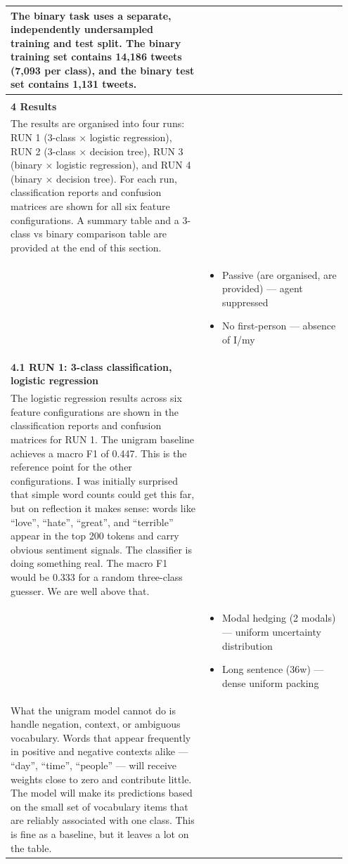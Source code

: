 \documentclass[11pt]{article}
\begin{document}
\begin{longtable}{|p{0.55\linewidth}|p{0.40\linewidth}|}
\hline
The binary task uses a separate, independently undersampled training and test split. The binary training set contains 14,186 tweets (7,093 per class), and the binary test set contains 1,131 tweets. & \\[2pt]
\hline
\rule[-3.5cm]{0pt}{3.5cm} &  \\
\hline
\textbf{4 Results}\\[4pt]
The results are organised into four runs: RUN 1 (3-class × logistic regression), RUN 2 (3-class × decision tree), RUN 3 (binary × logistic regression), and RUN 4 (binary × decision tree). For each run, classification reports and confusion matrices are shown for all six feature configurations. A summary table and a 3-class vs binary comparison table are provided at the end of this section. & \\[2pt]
\hline
\rule[-3.5cm]{0pt}{3.5cm} & \begin{itemize}[leftmargin=1em,itemsep=1pt,topsep=1pt,parsep=0pt]
  \item Passive (are organised, are provided) --- agent suppressed
  \item No first-person --- absence of I/my
\end{itemize} \\
\hline
\textbf{4.1 RUN 1: 3-class classification, logistic regression}\\[4pt]
The logistic regression results across six feature configurations are shown in the classification reports and confusion matrices for RUN 1. The unigram baseline achieves a macro F1 of 0.447. This is the reference point for the other configurations. I was initially surprised that simple word counts could get this far, but on reflection it makes sense: words like ``love'', ``hate'', ``great'', and ``terrible'' appear in the top 200 tokens and carry obvious sentiment signals. The classifier is doing something real. The macro F1 would be 0.333 for a random three-class guesser. We are well above that. & \\[2pt]
\hline
\rule[-3.5cm]{0pt}{3.5cm} & \begin{itemize}[leftmargin=1em,itemsep=1pt,topsep=1pt,parsep=0pt]
  \item Modal hedging (2 modals) --- uniform uncertainty distribution
  \item Long sentence (36w) --- dense uniform packing
\end{itemize} \\
\hline
What the unigram model cannot do is handle negation, context, or ambiguous vocabulary. Words that appear frequently in positive and negative contexts alike --- ``day'', ``time'', ``people'' --- will receive weights close to zero and contribute little. The model will make its predictions based on the small set of vocabulary items that are reliably associated with one class. This is fine as a baseline, but it leaves a lot on the table. & \\[2pt]

\end{longtable}
\end{document}
